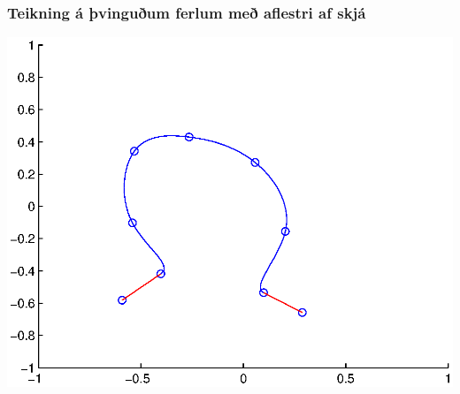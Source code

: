 \documentclass[a4]{article}
\begin{document}
\subsubsection{Teikning á þvinguðum ferlum með aflestri af skjá }

\includegraphics[height=0.495\textheight]{Ss2.eps}\\
\end{document}
